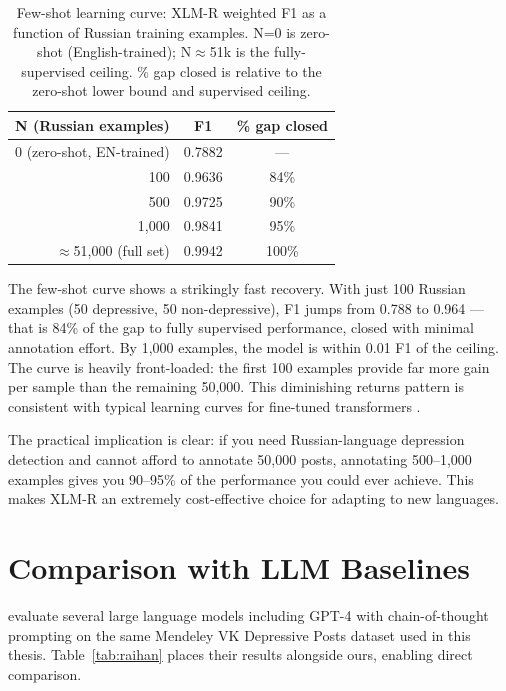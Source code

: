 \documentclass[12pt, a4paper, oneside]{report}
\begin{document}
\begin{table}[H]
\centering
\caption{Few-shot learning curve: XLM-R weighted F1 as a function of Russian training examples. N=0 is zero-shot (English-trained); N$\approx$51k is the fully-supervised ceiling. \% gap closed is relative to the zero-shot lower bound and supervised ceiling.}
\label{tab:fewshot}
\begin{tabular}{rcc}
\toprule
\textbf{N (Russian examples)} & \textbf{F1} & \textbf{\% gap closed} \\
\midrule
0 (zero-shot, EN-trained)       & 0.7882 & ---  \\
100                             & 0.9636 & 84\% \\
500                             & 0.9725 & 90\% \\
1,000                           & 0.9841 & 95\% \\
$\approx$51,000 (full set)      & 0.9942 & 100\% \\
\bottomrule
\end{tabular}
\end{table}

The few-shot curve shows a strikingly fast recovery. With just 100 Russian examples (50 depressive, 50 non-depressive), F1 jumps from 0.788 to 0.964 — that is 84\% of the gap to fully supervised performance, closed with minimal annotation effort. By 1,000 examples, the model is within 0.01 F1 of the ceiling. The curve is heavily front-loaded: the first 100 examples provide far more gain per sample than the remaining 50,000. This diminishing returns pattern is consistent with typical learning curves for fine-tuned transformers \citep{devlin2019bert}.

The practical implication is clear: if you need Russian-language depression detection and cannot afford to annotate 50,000 posts, annotating 500--1,000 examples gives you 90--95\% of the performance you could ever achieve. This makes XLM-R an extremely cost-effective choice for adapting to new languages.

\section{Comparison with LLM Baselines}

\citet{raihan2025} evaluate several large language models including GPT-4 with chain-of-thought prompting on the same Mendeley VK Depressive Posts dataset used in this thesis. Table~\ref{tab:raihan} places their results alongside ours, enabling direct comparison.
\end{document}

